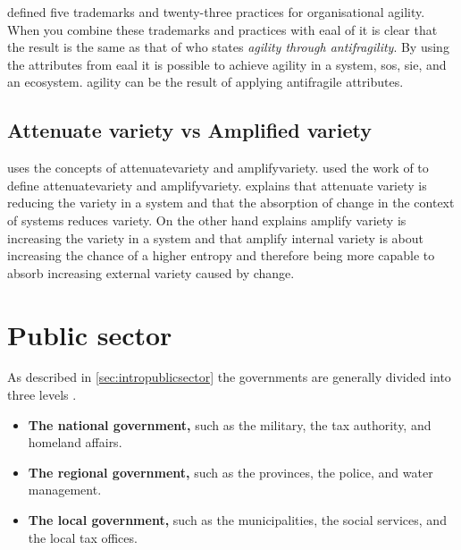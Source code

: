 \textcite[p.~7]{Aghina2018} defined five trademarks and twenty-three practices for organisational \gls{agility}. When you combine these trademarks and practices with \acrfull{eaal} of \textcite[p.~69]{Botjes2020} it is clear that the result is the same as that of \textcite[Abstract]{OReilly2019} who states \textit{\Gls{agility} through \Gls{antifragility}}. By using the attributes from \acrshort{eaal} it is possible to achieve \gls{agility} in a system, \acrlong{sos}, \acrlong{sie}, and an ecosystem. \Gls{agility} can be the result of applying \gls{antifragile} attributes.

\subsection{Attenuate variety vs Amplified variety}
\label{sub:attenuatevsaplify}

\textcite[p.~4]{Botjes2021} uses the concepts of \gls{attenuatevariety} and \gls{amplifyvariety}. \textcite[p.~4]{Botjes2021} used the work of \textcites{Ashby1979}{Beer1994} to define \gls{attenuatevariety} and \gls{amplifyvariety}. \textcite[p.~4]{Botjes2021} explains that attenuate variety is reducing the variety in a system and that the absorption of change in the context of systems reduces variety. On the other hand \textcite[p.~4]{Botjes2021} explains amplify variety is increasing the variety in a system and that amplify internal variety is about increasing the chance of a higher entropy and therefore being more capable to absorb increasing external variety caused by change. 




\section{Public sector}
\label{sec:tbpublicsector}


As described in \cref{sec:intropublicsector}  the governments are generally divided into three levels \parencite{PrivacySense2016}.

\begin{itemize}
	\item{\textbf{The national government,} such as the military, the tax authority, and homeland affairs.}
	\item{\textbf{The regional government,} such as the provinces, the police, and water management.}
	\item{\textbf{The local government,} such as the municipalities, the social services, and the local tax offices.}
\end{itemize}

